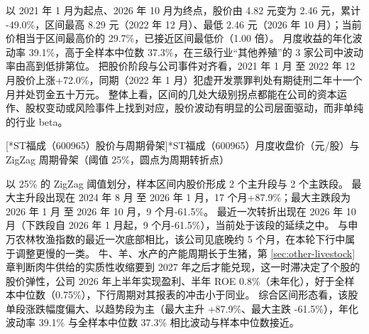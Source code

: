 以 2021 年 1 月为起点、2026 年 10 月为终点，股价由 4.82 元变为 2.46 元，累计 -49.0\%，区间最高 8.29 元（2022 年 12 月）、最低 2.46 元（2026 年 10 月）；当前价相当于区间最高价的 29.7\%，已接近区间最低价（1.00 倍）。 月度收益的年化波动率 39.1\%，高于全样本中位数 37.3\%，在三级行业“其他养殖”的 3 家公司中波动率由高到低排第位。 把股价阶段与公司事件对齐看，2021 年 1 月 至 2022 年 12 月股价上涨+72.0\%，同期（2022 年 1 月）犯虚开发票罪判处有期徒刑二年十一个月并处罚金五十万元。 整体上看，区间的几处大级别拐点都能在公司的资本运作、股权变动或风险事件上找到对应，股价波动有明显的公司层面驱动，而非单纯的行业 beta。

\begin{center}
\begin{minipage}{\textwidth}\centering
{}

[*ST福成（600965）股价与周期骨架]{*ST福成（600965）月度收盘价（元/股）与 ZigZag 周期骨架（阈值 25\%，圆点为周期转折点）}
\end{minipage}
\end{center}

 以 25\% 的 ZigZag 阈值划分，样本区间内股价形成 2 个主升段与 2 个主跌段。 最大主升段出现在 2024 年 8 月 至 2026 年 1 月，17 个月+87.9\%；最大主跌段为 2026 年 1 月 至 2026 年 10 月，9 个月-61.5\%。 最近一次转折出现在 2026 年 10 月（下跌段自 2026 年 1 月起，9 个月-61.5\%），当前处于该段的延续之中。 与申万农林牧渔指数的最近一次底部相比，该公司见底晚约 5 个月，在本轮下行中属于调整更慢的一类。 牛、羊、水产的产能周期长于生猪，第 \ref{sec:other-livestock} 章判断肉牛供给的实质性收缩要到 2027 年之后才能兑现，这一时滞决定了个股的股价弹性，公司 2026 年上半年实现盈利、半年 ROE 0.8\%（未年化），好于全样本中位数（0.75\%），下行周期对其报表的冲击小于同业。 综合区间形态看，该股单段涨跌幅度偏大、以趋势段为主（最大主升 +87.9\%、最大主跌 -61.5\%），年化波动率 39.1\% 与全样本中位数 37.3\% 相比波动与样本中位数接近。

